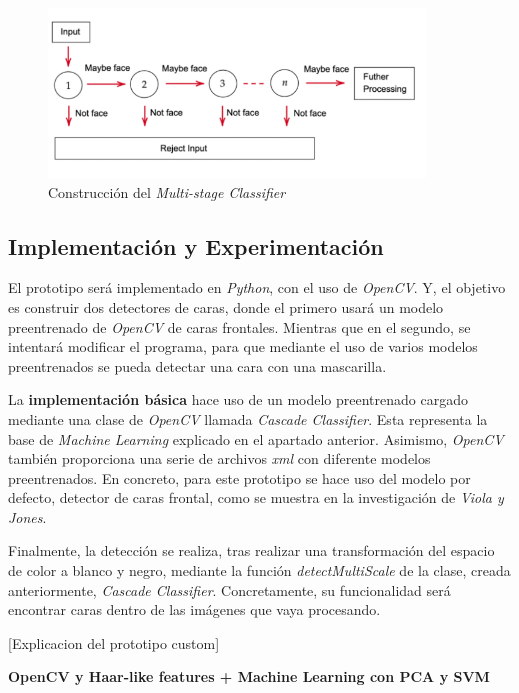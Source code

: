 \begin{figure}[htp]
	\centering
	\includegraphics[width=10cm]{imagenes/ada2.png}
	\caption{Construcción del \textit{Multi-stage Classifier}}
	\label{fig:ada2}
\end{figure}


\subsection*{Implementación y Experimentación}

El prototipo será implementado en \textit{Python}, con el uso de \textit{OpenCV}. Y, el objetivo es construir dos detectores de caras, donde el primero usará un modelo preentrenado de \textit{OpenCV} de caras frontales. Mientras que en el segundo, se intentará modificar el programa, para que mediante el uso de varios modelos preentrenados se pueda detectar una cara con una mascarilla.

La \textbf{implementación básica} hace uso de un modelo preentrenado cargado mediante una clase de \textit{OpenCV} llamada \textit{Cascade Classifier}. Esta representa la base de \textit{Machine Learning} explicado en el apartado anterior. Asimismo, \textit{OpenCV} también proporciona una serie de archivos \textit{xml} con diferente modelos preentrenados. En concreto, para este prototipo se hace uso del modelo por defecto, detector de caras frontal, como se muestra en la investigación de \textit{Viola y Jones}.

Finalmente, la detección se realiza, tras realizar una transformación del espacio de color a blanco y negro, mediante la función \textit{detectMultiScale} de la clase, creada anteriormente, \textit{Cascade Classifier}. Concretamente, su funcionalidad será encontrar caras dentro de las imágenes que vaya procesando.

[Explicacion del prototipo custom]

\textbf{OpenCV y Haar-like features + Machine Learning con PCA y SVM}

